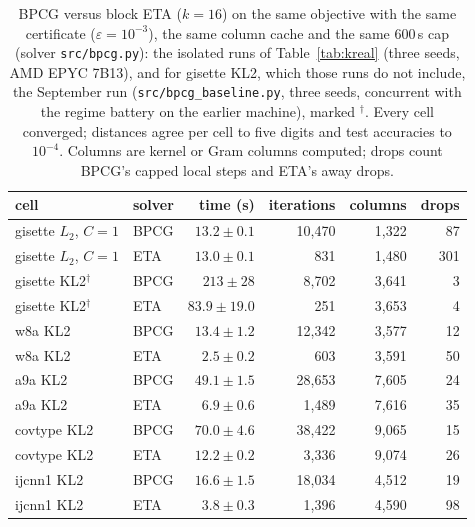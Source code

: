 \begin{table}[htbp]\centering\scriptsize
\caption{BPCG \citep{tsuji2022} versus block ETA ($k{=}16$) on the same
objective with the same certificate ($\varepsilon{=}10^{-3}$), the same
column cache and the same 600\,s cap (solver \texttt{src/bpcg.py}):
the isolated runs of Table~\ref{tab:kreal} (three seeds, AMD EPYC
7B13), and for gisette KL2, which those runs do not include, the
September run (\texttt{src/bpcg\_baseline.py}, three seeds, concurrent
with the regime battery on the earlier machine), marked $^\dagger$.
Every cell converged; distances agree per cell to five digits and test
accuracies to $10^{-4}$. Columns are kernel or Gram columns computed;
drops count BPCG's capped local steps and ETA's away drops.}\label{tab:bpcg}
\begin{tabular}{llrrrr}\toprule
cell & solver & time (s) & iterations & columns & drops \\\midrule
gisette $L_2$, $C{=}1$ & BPCG & $13.2\pm0.1$ & 10,470 & 1,322 & 87 \\
gisette $L_2$, $C{=}1$ & ETA & $13.0\pm0.1$ & 831 & 1,480 & 301 \\
\midrule
gisette KL2$^\dagger$ & BPCG & $213\pm28$ & 8,702 & 3,641 & 3 \\
gisette KL2$^\dagger$ & ETA & $83.9\pm19.0$ & 251 & 3,653 & 4 \\
w8a KL2 & BPCG & $13.4\pm1.2$ & 12,342 & 3,577 & 12 \\
w8a KL2 & ETA & $2.5\pm0.2$ & 603 & 3,591 & 50 \\
a9a KL2 & BPCG & $49.1\pm1.5$ & 28,653 & 7,605 & 24 \\
a9a KL2 & ETA & $6.9\pm0.6$ & 1,489 & 7,616 & 35 \\
covtype KL2 & BPCG & $70.0\pm4.6$ & 38,422 & 9,065 & 15 \\
covtype KL2 & ETA & $12.2\pm0.2$ & 3,336 & 9,074 & 26 \\
ijcnn1 KL2 & BPCG & $16.6\pm1.5$ & 18,034 & 4,512 & 19 \\
ijcnn1 KL2 & ETA & $3.8\pm0.3$ & 1,396 & 4,590 & 98 \\
\bottomrule\end{tabular}\end{table}

